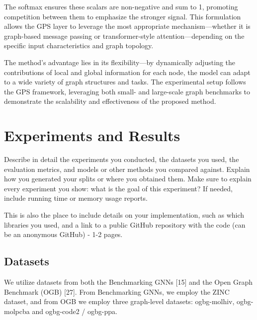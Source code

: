 \documentclass{acmart}
\begin{document}
The softmax ensures these scalars are non-negative and sum to 1, promoting competition between them to emphasize the stronger signal. This formulation allows the GPS layer to leverage the most appropriate mechanism—whether it is graph-based message passing or transformer-style attention—depending on the specific input characteristics and graph topology.


The method's advantage lies in its flexibility—by dynamically adjusting the contributions of local and global information for each node, the model can adapt to a wide variety of graph structures and tasks. The experimental setup follows the GPS framework, leveraging both small- and large-scale graph benchmarks to demonstrate the scalability and effectiveness of the proposed method.

\section{Experiments and Results}
Describe in detail the experiments you conducted, the datasets you used, the evaluation metrics, and models or other methods you compared against. Explain how you generated your splits or where you obtained them. Make sure to explain every experiment you show: what is the goal of this experiment? If needed, include running time or memory usage reports.

This is also the place to include details on your implementation, such as which libraries you used, and a link to a public GitHub repository with the code (can be an anonymous GitHub) - 1-2 pages.

\subsection{Datasets}
We utilize datasets from both the Benchmarking GNNs [15] and the Open Graph Benchmark (OGB) [27]. From Benchmarking GNNs, we employ the ZINC dataset, and from OGB we employ three graph-level datasets: ogbg-molhiv, ogbg-molpcba and ogbg-code2 / ogbg-ppa.
\end{document}
